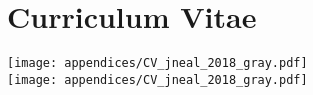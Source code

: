 \chapter{Curriculum Vitae}
\label{app_ch:cv}
{\centering
    {\texttt{[image: appendices/CV\_jneal\_2018\_gray.pdf]}}\\
    {\texttt{[image: appendices/CV\_jneal\_2018\_gray.pdf]}}
}
\clearpage